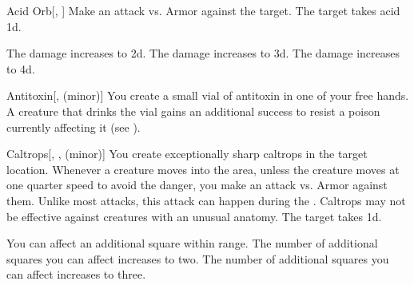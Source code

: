 \lowercase{\hypertarget{spell:Acid Orb}{}}\label{spell:Acid Orb}
\begin{freeability}[Rank 1]{\hypertarget{spell:Acid Orb}{Acid Orb}}[, ]
Make an attack vs. Armor against the target.
\hit The target takes acid  \plus1d.

\rankline
{} The damage increases to  \plus2d.
 The damage increases to  \plus3d.
 The damage increases to  \plus4d.
\end{freeability}
\vspace{0.25em}



\lowercase{\hypertarget{spell:Antitoxin}{}}\label{spell:Antitoxin}
\begin{freeability}[Rank 1]{\hypertarget{spell:Antitoxin}{Antitoxin}}[,  (minor)]
You create a small vial of antitoxin in one of your free hands.
A creature that drinks the vial gains an additional success to resist a poison currently affecting it (see ).
\end{freeability}
\vspace{0.25em}



\lowercase{\hypertarget{spell:Caltrops}{}}\label{spell:Caltrops}
\begin{freeability}[Rank 1]{\hypertarget{spell:Caltrops}{Caltrops}}[, ,  (minor)]
You create exceptionally sharp caltrops in the target location.
Whenever a creature moves into the area, unless the creature moves at one quarter speed to avoid the danger, you make an attack vs. Armor against them.
Unlike most attacks, this attack can happen during the .
Caltrops may not be effective against creatures with an unusual anatomy.
\hit The target takes  \minus1d.

\rankline
{} You can affect an additional square within range.
 The number of additional squares you can affect increases to two.
 The number of additional squares you can affect increases to three.
\end{freeability}
\vspace{0.25em}



